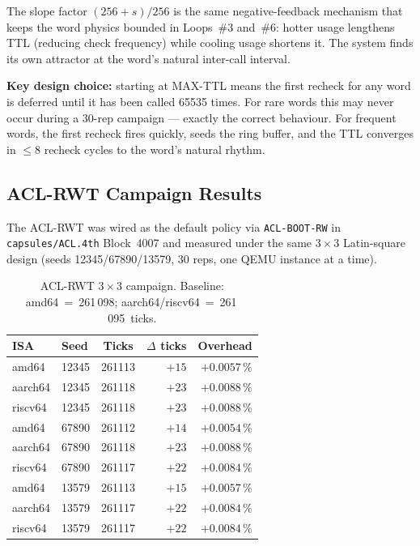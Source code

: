 \documentclass[10pt,a4paper]{article}
\begin{document}
The slope factor $(256+s)/256$ is the same negative-feedback mechanism that
keeps the word physics bounded in Loops~\#3 and~\#6: hotter usage lengthens
TTL (reducing check frequency) while cooling usage shortens it.  The system
finds its own attractor at the word's natural inter-call interval.

\textbf{Key design choice:} starting at MAX-TTL means the first recheck for
any word is deferred until it has been called 65535 times.  For rare words
this may never occur during a 30-rep campaign --- exactly the correct
behaviour.  For frequent words, the first recheck fires quickly, seeds the
ring buffer, and the TTL converges in $\leq 8$ recheck cycles to the word's
natural rhythm.

\subsection{ACL-RWT Campaign Results}
\label{sec:acl_rwt_results}

The ACL-RWT was wired as the default policy via \texttt{ACL-BOOT-RW} in
\texttt{capsules/ACL.4th} Block~4007 and measured under the same $3\times3$
Latin-square design (seeds 12345/67890/13579, 30 reps, one QEMU instance at
a time).

\begin{table}[h!]
\centering
\caption{ACL-RWT $3\times3$ campaign.
  Baseline: amd64~=~261\,098; aarch64/riscv64~=~261\,095~ticks.}
\label{tab:acl_rwt}
\begin{tabular}{llSrr}
\toprule
\textbf{ISA} & \textbf{Seed} & \textbf{Ticks} & \textbf{$\Delta$ ticks} & \textbf{Overhead} \\
\midrule
amd64   & 12345 & 261113 & $+15$ & $+0.0057\,\%$ \\
aarch64 & 12345 & 261118 & $+23$ & $+0.0088\,\%$ \\
riscv64 & 12345 & 261118 & $+23$ & $+0.0088\,\%$ \\
\midrule
amd64   & 67890 & 261112 & $+14$ & $+0.0054\,\%$ \\
aarch64 & 67890 & 261118 & $+23$ & $+0.0088\,\%$ \\
riscv64 & 67890 & 261117 & $+22$ & $+0.0084\,\%$ \\
\midrule
amd64   & 13579 & 261113 & $+15$ & $+0.0057\,\%$ \\
aarch64 & 13579 & 261117 & $+22$ & $+0.0084\,\%$ \\
riscv64 & 13579 & 261117 & $+22$ & $+0.0084\,\%$ \\
\bottomrule
\end{tabular}
\end{table}
\end{document}
